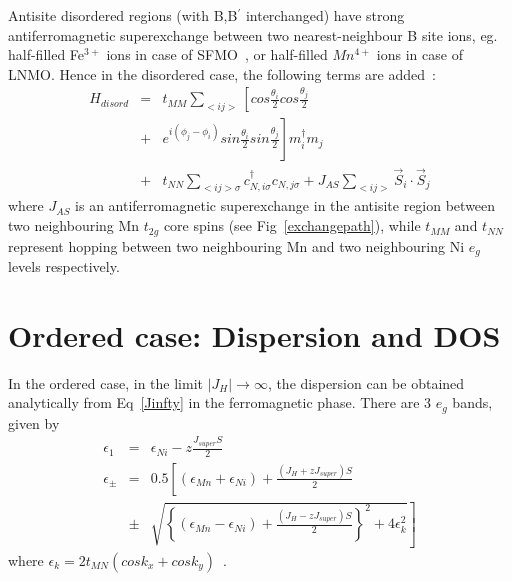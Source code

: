 \documentclass[english,aps,prb,twocolumn,showpacs]{revtex4-1}
\begin{document}
Antisite disordered regions (with B,B$^{\prime}$ interchanged) have strong antiferromagnetic superexchange 
between two nearest-neighbour B site ions, eg. half-filled Fe$^{3+}$ ions 
in case of SFMO~\cite{meDD}, or half-filled $Mn^{4+}$ ions in case of LNMO.
Hence in the disordered case, the following terms are added~\cite{FGuinea}:
\begin{eqnarray}
H_{disord}&=&t_{MM}\sum_{<ij>}\left[cos\frac{\theta_{i}}{2}cos\frac{\theta_{j}}{2}\right. \nonumber \\
          &+&\left.e^{i(\phi_{j}-\phi_{i})}sin\frac{\theta_{i}}{2}sin\frac{\theta_{j}}{2}\right] m_{i}^{\dagger}m_{j} \nonumber \\
&+&t_{NN}\sum_{<ij>\sigma}c_{N,i\sigma}^{\dagger}c_{N,j\sigma} 
          +J_{AS}\sum_{<ij>}\vec{S}_{i}\cdot\vec{S}_{j}
\label{antisite}
\end{eqnarray}
where $J_{AS}$ is an antiferromagnetic superexchange in the antisite region between two
neighbouring Mn $t_{2g}$ core spins (see Fig~\ref{exchangepath}),
 while $t_{MM}$ and $t_{NN}$ represent hopping between two neighbouring Mn 
 and two neighbouring Ni $e_{g}$ levels respectively.

\section{Ordered case: Dispersion and DOS}


In the ordered case, in the limit $|J_{H}|\rightarrow\infty$, the dispersion can be obtained analytically
from Eq~\ref{Jinfty} in the ferromagnetic phase. There are 3 $e_{g}$ bands, given by
\begin{eqnarray}
\epsilon_{1}&=&\epsilon_{Ni}-z\frac{J_{super}S}{2} \\
\epsilon_{\pm}&=&0.5\left[(\epsilon_{Mn}+\epsilon_{Ni})+\frac{(J_{H}+zJ_{super})S}{2}\right. \nonumber \\
&\pm&\left.\sqrt{\left\{(\epsilon_{Mn}-\epsilon_{Ni})+\frac{(J_{H}-zJ_{super})S}{2}\right\}^{2}+4\epsilon_{k}^{2}}\right]
\label{dispersion}
\end{eqnarray}
where $\epsilon_{k}=2t_{MN}(cosk_{x}+cosk_{y})$~\cite{Millis}. 
 
\end{document}
